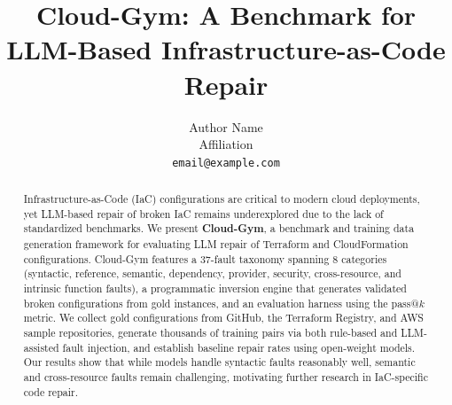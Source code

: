 \documentclass[11pt]{article}
\title{Cloud-Gym: A Benchmark for LLM-Based Infrastructure-as-Code Repair}
\author{
  Author Name \\
  Affiliation \\
  \texttt{email@example.com}
}
\date{}
\begin{document}
\maketitle

\begin{abstract}
Infrastructure-as-Code (IaC) configurations are critical to modern cloud deployments, yet LLM-based repair of broken IaC remains underexplored due to the lack of standardized benchmarks. We present \textbf{Cloud-Gym}, a benchmark and training data generation framework for evaluating LLM repair of Terraform and CloudFormation configurations. Cloud-Gym features a 37-fault taxonomy spanning 8 categories (syntactic, reference, semantic, dependency, provider, security, cross-resource, and intrinsic function faults), a programmatic inversion engine that generates validated broken configurations from gold instances, and an evaluation harness using the pass@$k$ metric. We collect gold configurations from GitHub, the Terraform Registry, and AWS sample repositories, generate thousands of training pairs via both rule-based and LLM-assisted fault injection, and establish baseline repair rates using open-weight models. Our results show that while models handle syntactic faults reasonably well, semantic and cross-resource faults remain challenging, motivating further research in IaC-specific code repair.
\end{abstract}










\end{document}
